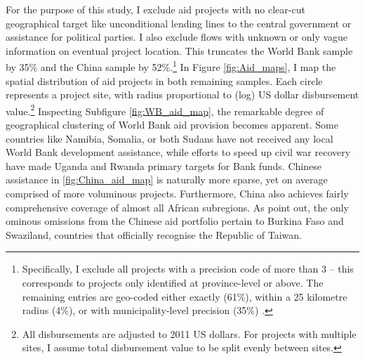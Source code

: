\documentclass[11pt, oneside]{article}   	%
\begin{document}
For the purpose of this study, I exclude aid projects with no clear-cut geographical target like unconditional lending lines to the central government or assistance for political parties. I also exclude flows with unknown or only vague information on eventual project location. This truncates the World Bank sample by 35\% and the China sample by 52\%.\footnote{Specifically, I exclude all projects with a precision code of more than 3 -- this corresponds to projects only identified at province-level or above. The remaining entries are geo-coded either exactly (61\%), within a 25 kilometre radius (4\%), or with municipality-level precision (35\%) \citep{Strandow_UCDPAidDatacodebook_2011a}.} In Figure \eqref{fig:Aid_maps}, I map the spatial distribution of aid projects in both remaining samples. Each circle represents a project site, with radius proportional to (log) US dollar disbursement value.\footnote{All disbursements are adjusted to 2011 US dollars. For projects with multiple sites, I assume total disbursement value to be split evenly between sites.} Inspecting Subfigure \eqref{fig:WB_aid_map}, the remarkable degree of geographical clustering of World Bank aid provision becomes apparent. Some countries like Namibia, Somalia, or both Sudans have not received any local World Bank development assistance, while efforts to speed up civil war recovery have made Uganda and Rwanda primary targets for Bank funds. Chinese assistance in \eqref{fig:China_aid_map} is naturally more sparse, yet on average comprised of more voluminous projects. Furthermore, China also achieves fairly comprehensive coverage of almost all African subregions. As \cite{Strange_TrackingUnderreportedFinancial_2017} point out, the only ominous omissions from the Chinese aid portfolio pertain to Burkina Faso and Swaziland, countries that officially recognise the Republic of Taiwan.
\end{document}
